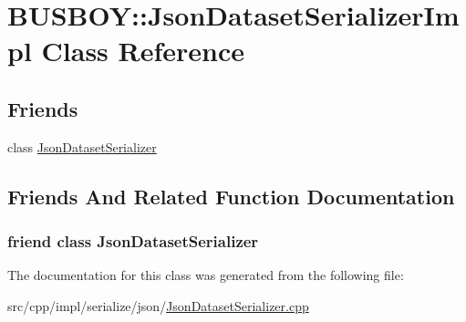 \hypertarget{classBUSBOY_1_1JsonDatasetSerializerImpl}{
\section{BUSBOY::JsonDatasetSerializerImpl Class Reference}
\label{classBUSBOY_1_1JsonDatasetSerializerImpl}
}
\subsection*{Friends}
\begin{DoxyCompactItemize}
\item 
class \hyperlink{classBUSBOY_1_1JsonDatasetSerializerImpl_a86648204d0abe59b2f74be80336d9c94}{JsonDatasetSerializer}
\end{DoxyCompactItemize}


\subsection{Friends And Related Function Documentation}
\hypertarget{classBUSBOY_1_1JsonDatasetSerializerImpl_a86648204d0abe59b2f74be80336d9c94}{
\subsubsection[{JsonDatasetSerializer}]{\setlength{\rightskip}{0pt plus 5cm}friend class {\bf JsonDatasetSerializer}}}
\label{classBUSBOY_1_1JsonDatasetSerializerImpl_a86648204d0abe59b2f74be80336d9c94}


The documentation for this class was generated from the following file:\begin{DoxyCompactItemize}
\item 
src/cpp/impl/serialize/json/\hyperlink{JsonDatasetSerializer_8cpp}{JsonDatasetSerializer.cpp}\end{DoxyCompactItemize}

